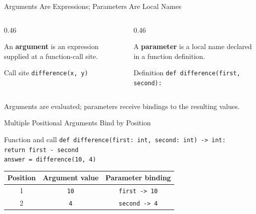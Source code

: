 \documentclass[aspectratio=169,10pt]{beamer}
\begin{document}

\begin{frame}{Arguments Are Expressions; Parameters Are Local Names}
  \begin{columns}[T,onlytextwidth]
    \begin{column}{0.46\textwidth}
      \begin{cpdefinition}
        An \textbf{argument} is an expression supplied at a function-call site.
      \end{cpdefinition}

      \begin{block}{Call site}
        \texttt{difference(x, y)}
      \end{block}
    \end{column}

    \begin{column}{0.46\textwidth}
      \begin{cpdefinition}
        A \textbf{parameter} is a local name declared in a function definition.
      \end{cpdefinition}

      \begin{block}{Definition}
        \texttt{def difference(first, second):}
      \end{block}
    \end{column}
  \end{columns}

  \begin{keyidea}
    Arguments are evaluated; parameters receive bindings to the resulting values.
  \end{keyidea}
\end{frame}

\begin{frame}{Multiple Positional Arguments Bind by Position}
  \begin{block}{Function and call}
    \texttt{def difference(first: int, second: int) -> int:}\\
    \hspace*{0.22in}\texttt{return first - second}\\[0.08in]
    \texttt{answer = difference(10, 4)}
  \end{block}

  \begin{center}
    \renewcommand{\arraystretch}{1.35}
    \begin{tabular}{c|c|c}
      \textbf{Position} & \textbf{Argument value} & \textbf{Parameter binding} \\\hline
      1 & \texttt{10} & \texttt{first -> 10} \\
      2 & \texttt{4} & \texttt{second -> 4}
    \end{tabular}
  \end{center}
\end{frame}
\end{document}
